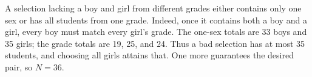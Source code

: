 A selection lacking a boy and girl from different grades either contains only one sex or has all students from one grade. Indeed, once it contains both a boy and a girl, every boy must match every girl's grade. The one-sex totals are 33 boys and 35 girls; the grade totals are 19, 25, and 24. Thus a bad selection has at most 35 students, and choosing all girls attains that. One more guarantees the desired pair, so $\boxed{N=36}$.
